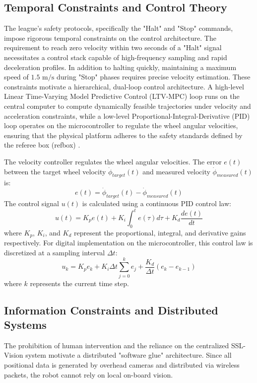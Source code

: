 \documentclass[a4paper,twoside,12pt]{report}
\begin{document}
\subsection{Temporal Constraints and Control Theory}
The league's safety protocols, specifically the "Halt" and "Stop" commands, impose rigorous temporal constraints on the control architecture. The requirement to reach zero velocity within two seconds of a "Halt" signal necessitates a control stack capable of high-frequency sampling and rapid deceleration profiles. In addition to halting quickly, maintaining a maximum speed of $1.5\text{ m/s}$ during "Stop" phases requires precise velocity estimation. These constraints motivate a hierarchical, dual-loop control architecture. A high-level Linear Time-Varying Model Predictive Control (LTV-MPC) loop runs on the central computer to compute dynamically feasible trajectories under velocity and acceleration constraints, while a low-level Proportional-Integral-Derivative (PID) loop operates on the microcontroller to regulate the wheel angular velocities, ensuring that the physical platform adheres to the safety standards defined by the referee box (refbox) \citep{pacheco2015testing}.

The velocity controller regulates the wheel angular velocities. The error $e(t)$ between the target wheel velocity $\dot{\phi}_{target}(t)$ and measured velocity $\dot{\phi}_{measured}(t)$ is:
\begin{equation}
e(t) = \dot{\phi}_{target}(t) - \dot{\phi}_{measured}(t)
\label{eq:error}
\end{equation}
The control signal $u(t)$ is calculated using a continuous PID control law:
\begin{equation}
u(t) = K_p e(t) + K_i \int_{0}^{t} e(\tau) d\tau + K_d \frac{de(t)}{dt}
\label{eq:pid}
\end{equation}
where $K_p$, $K_i$, and $K_d$ represent the proportional, integral, and derivative gains respectively. For digital implementation on the microcontroller, this control law is discretized at a sampling interval $\Delta t$:
\begin{equation}
u_k = K_p e_k + K_i \Delta t \sum_{j=0}^{k} e_j + \frac{K_d}{\Delta t} (e_k - e_{k-1})
\label{eq:discrete_pid}
\end{equation}
where $k$ represents the current time step.

\subsection{Information Constraints and Distributed Systems}
The prohibition of human intervention and the reliance on the centralized SSL-Vision system motivate a distributed "software glue" architecture. Since all positional data is generated by overhead cameras and distributed via wireless packets, the robot cannot rely on local on-board vision.
\end{document}
